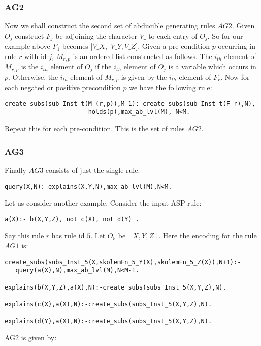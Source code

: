 \subsubsection{AG2}
Now we shall construct the second set
of abducible generating rules $AG2$. Given $O_{j}$ construct $F_{j}$ be adjoining the character
$V\_$ to each entry of $O_{j}$. So for our example above $F_{1}$ becomes
$[V\_X,$ $V\_Y,V\_Z]$. Given a pre-condition $p$
occurring in rule $r$ with id $j$, $M_{r,p}$ is an ordered list constructed as follows. The
$i_{th}$ element of $M_{r,p}$ is the $i_{th}$ element of $O_{j}$ if the
$i_{th}$ element of $O_{j}$ is a variable which occurs in $p$. Otherwise, the
$i_{th}$ element of $M_{r,p}$ is given by the $i_{th}$ element of $F_{r}$. Now
for each negated or positive precondition $p$ we have the following rule:
\begin{lstlisting}[frame=none]
 create_subs(sub_Inst_t(M_(r,p)),M-1):-create_subs(sub_Inst_t(F_r),N),
                       holds(p),max_ab_lvl(M), N<M.   
\end{lstlisting}
Repeat this for each pre-condition. This is the set of rules $AG2$.


\subsubsection{AG3}
Finally $AG3$ consists of just the single rule:
\begin{lstlisting}[frame=none]
query(X,N):-explains(X,Y,N),max_ab_lvl(M),N<M.
\end{lstlisting}
Let us consider another example.
Consider the input ASP rule:
\begin{lstlisting}[frame=none]
a(X):- b(X,Y,Z), not c(X), not d(Y) .    
\end{lstlisting}
Say this rule $r$ has rule id $5$. 
Let $O_{5}$ be $[X,Y,Z]$. Here the encoding for the rule $AG1$ is:
\begin{lstlisting}[frame=none]
create_subs(subs_Inst_5(X,skolemFn_5_Y(X),skolemFn_5_Z(X)),N+1):-
   query(a(X),N),max_ab_lvl(M),N<M-1.

explains(b(X,Y,Z),a(X),N):-create_subs(subs_Inst_5(X,Y,Z),N).

explains(c(X),a(X),N):-create_subs(subs_Inst_5(X,Y,Z),N).

explains(d(Y),a(X),N):-create_subs(subs_Inst_5(X,Y,Z),N).
\end{lstlisting}
AG2 is given by:

